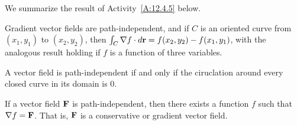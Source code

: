

We summarize the result of Activity~\ref{A:12.4.5} below.

\nin {} \vspace*{5pt}



\begin{summary}
\item Gradient vector fields are path-independent, and if $C$ is an
  oriented curve from $(x_1,y_1)$ to $(x_2,y_2)$, then $\int_C\nabla f\cdot
  d\mathbf{r} = f(x_2,y_2)-f(x_1,y_1)$, with the analogous result holding if
  $f$ is a function of three variables.
\item A vector field is path-independent if and only if the
  ciruclation around every closed curve in its domain is $0$.
\item If a vector field $\mathbf{F}$ is path-independent, then there exists a
  function $f$ such that $\nabla f = \mathbf{F}$. That is, $\mathbf{F}$ is a
  conservative or gradient vector field.
\end{summary}

\nin \hrulefill

%

\clearpage

